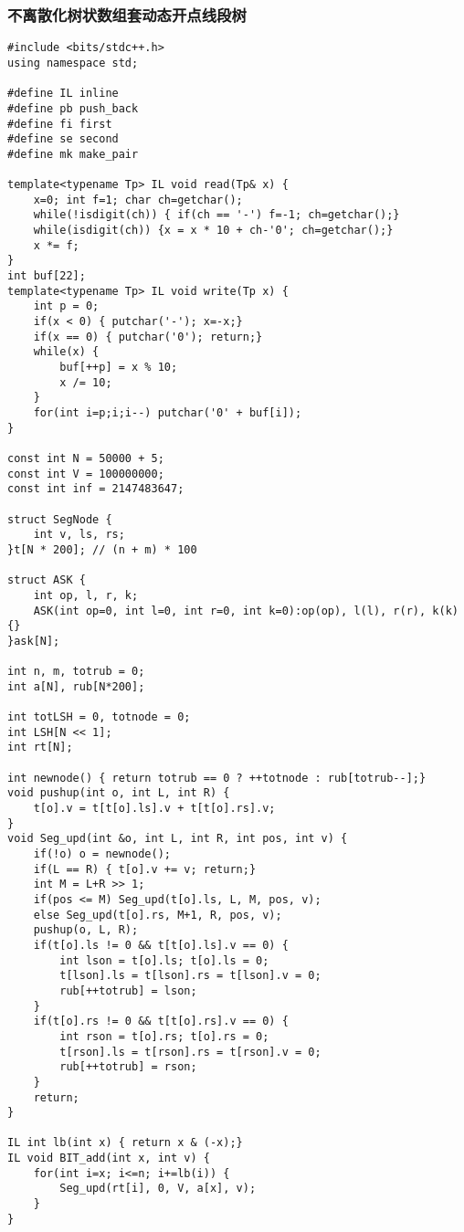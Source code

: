 \documentclass[UTF8]{ctexart}
\begin{document}
\subsubsection{不离散化树状数组套动态开点线段树}

\begin{framed}
\begin{lstlisting}
#include <bits/stdc++.h>
using namespace std;

#define IL inline
#define pb push_back
#define fi first
#define se second
#define mk make_pair

template<typename Tp> IL void read(Tp& x) {
    x=0; int f=1; char ch=getchar();
    while(!isdigit(ch)) { if(ch == '-') f=-1; ch=getchar();}
    while(isdigit(ch)) {x = x * 10 + ch-'0'; ch=getchar();}
    x *= f;
}
int buf[22];
template<typename Tp> IL void write(Tp x) {
    int p = 0;
    if(x < 0) { putchar('-'); x=-x;}
    if(x == 0) { putchar('0'); return;}
    while(x) {
        buf[++p] = x % 10;
        x /= 10;
    }
    for(int i=p;i;i--) putchar('0' + buf[i]);
}

const int N = 50000 + 5;
const int V = 100000000;
const int inf = 2147483647;

struct SegNode {
    int v, ls, rs;
}t[N * 200]; // (n + m) * 100

struct ASK {
    int op, l, r, k;
    ASK(int op=0, int l=0, int r=0, int k=0):op(op), l(l), r(r), k(k) {}
}ask[N];

int n, m, totrub = 0;
int a[N], rub[N*200];

int totLSH = 0, totnode = 0;
int LSH[N << 1];
int rt[N];

int newnode() { return totrub == 0 ? ++totnode : rub[totrub--];}
void pushup(int o, int L, int R) {
    t[o].v = t[t[o].ls].v + t[t[o].rs].v;
}
void Seg_upd(int &o, int L, int R, int pos, int v) {
    if(!o) o = newnode();
    if(L == R) { t[o].v += v; return;}
    int M = L+R >> 1;
    if(pos <= M) Seg_upd(t[o].ls, L, M, pos, v);
    else Seg_upd(t[o].rs, M+1, R, pos, v);
    pushup(o, L, R);
    if(t[o].ls != 0 && t[t[o].ls].v == 0) {
        int lson = t[o].ls; t[o].ls = 0;
        t[lson].ls = t[lson].rs = t[lson].v = 0;
        rub[++totrub] = lson;
    }
    if(t[o].rs != 0 && t[t[o].rs].v == 0) {
        int rson = t[o].rs; t[o].rs = 0;
        t[rson].ls = t[rson].rs = t[rson].v = 0;
        rub[++totrub] = rson;
    }
    return;
}

IL int lb(int x) { return x & (-x);}
IL void BIT_add(int x, int v) {
    for(int i=x; i<=n; i+=lb(i)) {
        Seg_upd(rt[i], 0, V, a[x], v);
    }
}


\end{lstlisting}
\end{framed}
\end{document}
